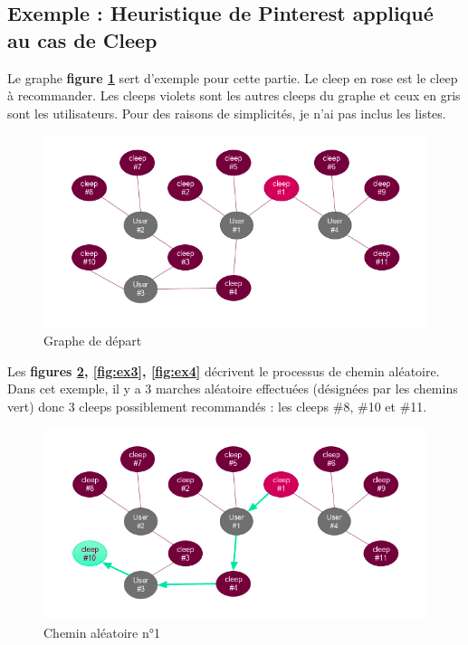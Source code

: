 \documentclass{article} %
\begin{document}
\subsection{Exemple : Heuristique de Pinterest appliqué au cas de Cleep}

Le graphe \textbf{figure \ref{fig:ex1}} sert d'exemple pour cette partie. Le cleep en rose est le cleep à recommander. Les cleeps violets sont les autres cleeps du graphe et ceux en gris sont les utilisateurs. Pour des raisons de simplicités, je n'ai pas inclus les listes.
\begin{figure}[!h]
	\centering
	\includegraphics[keepaspectratio = true,scale=0.6]{ex1}
	\caption{Graphe de départ}
	\label{fig:ex1}
\end{figure}

Les \textbf{figures \ref{fig:ex2}, \ref{fig:ex3}, \ref{fig:ex4}} décrivent le processus de chemin aléatoire. Dans cet exemple, il y a 3 marches aléatoire effectuées (désignées par les chemins vert) donc 3 cleeps possiblement recommandés : les cleeps \#8, \#10 et \#11.
\begin{figure}[!h]
	\centering
	\includegraphics[keepaspectratio = true,scale=0.6]{ex2}
	\caption{Chemin aléatoire n°1}
	\label{fig:ex2}
\end{figure}
\end{document}

